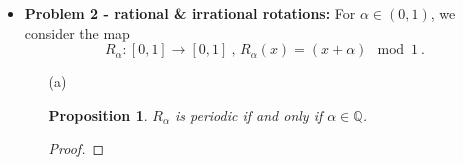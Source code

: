 \documentclass[12pt, reqno]{amsart}
\newtheorem{prop}{Proposition}[section]
\theoremstyle{definition}
\theoremstyle{remark}
\begin{document}
\begin{itemize}
\vspace{0.2 cm}

\item {\bf{Problem 2 - rational \& irrational rotations:}} For $\alpha \in (0,1)$, we consider the map 
\begin{equation}
R_\alpha: [0,1] \to [0,1] ~\mbox{, } R_\alpha(x) = (x + \alpha) \mod 1 ~\mbox{.}
\end{equation}



\vspace{0.1 cm}
\begin{itemize}
\item[(a)] %


\begin{prop}
$R_\alpha$ is periodic if and only if $\alpha \in \mathbb{Q}$.
\end{prop}

\begin{proof}
    

\end{proof}
\end{itemize}
\end{itemize}
\end{document}
